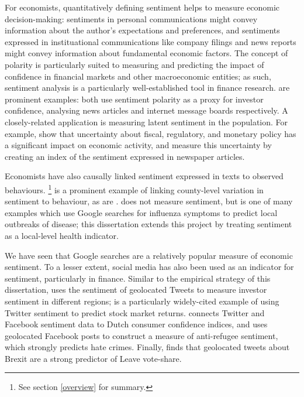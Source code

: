 \documentclass{article}
\begin{document}
For economists, quantitatively defining sentiment helps to measure economic decision-making: sentiments in personal communications might convey information about the author's expectations and preferences, and sentiments expressed in instituational communications like company filings and news reports might convey information about fundamental economic factors. The concept of polarity is particularly suited to measuring and predicting the impact of confidence in financial markets and other macroeconomic entities; as such, sentiment analysis is a particularly well-established tool in finance research. \textcite{tetlockGivingContentInvestor2007a,antweilerAllThatTalk2004} are prominent examples: both use sentiment polarity as a proxy for investor confidence, analysing news articles and internet message boards respectively. A closely-related application is measuring latent sentiment in the population. For example, \textcite{bakerMeasuringEconomicPolicy2016} show that uncertainty about fiscal, regulatory, and monetary policy has a significant impact on economic activity, and measure this uncertainty by creating an index of the sentiment expressed in newspaper articles. 

Economists have also causally linked sentiment expressed in texts to observed behaviours. \textcite{stephens-davidowitzCostRacialAnimus2014}\footnote{See section \ref{overview} for summary.} is a prominent example of linking county-level variation in sentiment to behaviour, as are \textcite{choiPredictingPresentGoogle2012,saizProxyingUnobservableVariables2013}. \textcite{ginsbergDetectingInfluenzaEpidemics2009} does not measure sentiment, but is one of many examples which use Google searches for influenza symptoms to predict local outbreaks of disease; this dissertation extends this project by treating sentiment as a local-level health indicator. 

We have seen that Google searches are a relatively popular measure of economic sentiment. To a lesser extent, social media has also been used as an indicator for sentiment, particularly in finance. Similar to the empirical strategy of this dissertation, \textcite{affusoSocialMediaSentiment2019} uses the sentiment of geolocated Tweets to measure investor sentiment in different regions; \textcite{bollenTwitterMoodPredicts2011a} is a particularly widely-cited example of using Twitter sentiment to predict stock market returns. \textcite{daasSocialMediaSentiment2014} connects Twitter and Facebook sentiment data to Dutch consumer confidence indices, and \textcite{mullerFanningFlamesHate2020} uses geolocated Facebook posts to construct a measure of anti-refugee sentiment, which strongly predicts hate crimes. Finally, \textcite{gorodnichenkoSocialMediaSentiment2018} finds that geolocated tweets about Brexit are a strong predictor of Leave vote-share.
\end{document}
